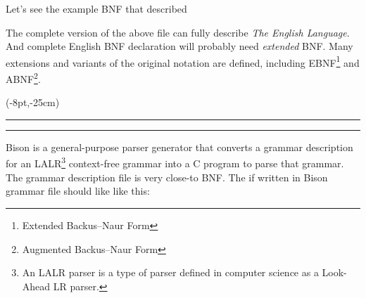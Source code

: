 Let's see the example BNF that described  

The complete version of the above file can fully describe \emph{The English Language}. 
And complete English BNF declaration will probably need \emph{extended} BNF. 
Many \mbox{extensions} and variants of the original notation are defined, including EBNF\footnote{Extended Backus--Naur Form} and ABNF\footnote{Augmented Backus--Naur Form}.

\thisfancyput(-8pt,-25cm){
\rule{.5pt}{25cm}
\hspace*{\textwidth}
\rule{.5pt}{25cm}
}


Bison\cite{bison} is a general-purpose parser generator that converts a grammar description for an LALR\footnote{An LALR parser is a type of parser defined in computer science as a Look-Ahead LR parser.} context-free grammar into a C program to parse that grammar.
The grammar description file is very close-to BNF. The    if written in Bison grammar file should like like this:

\renewcommand{\arraystretch}{1}

